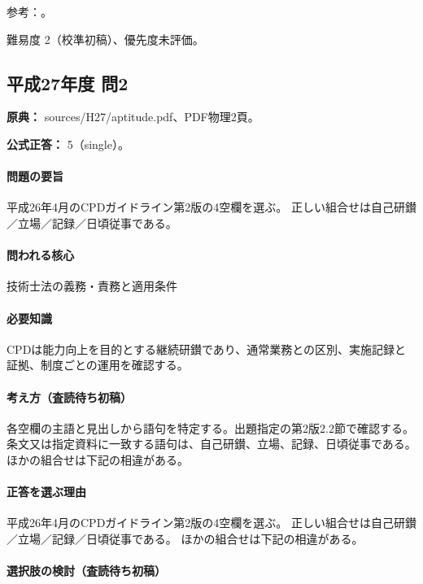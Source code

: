 \par 参考：\cite{cpd_v1}。

\par 難易度 2（校準初稿）、優先度未評価。

\subsection{平成27年度 問2}
\label{q:h27-reg-apt-02}

\noindent\textbf{原典：} sources/H27/aptitude.pdf、PDF物理2頁。

\textbf{公式正答：} 5（single）。

\paragraph{問題の要旨} 平成26年4月のCPDガイドライン第2版の4空欄を選ぶ。 正しい組合せは自己研鑚／立場／記録／日頃従事である。

\paragraph{問われる核心} 技術士法の義務・責務と適用条件

\paragraph{必要知識} CPDは能力向上を目的とする継続研鑚であり、通常業務との区別、実施記録と証拠、制度ごとの運用を確認する。

\paragraph{考え方（査読待ち初稿）} 各空欄の主語と見出しから語句を特定する。出題指定の第2版2.2節で確認する。 条文又は指定資料に一致する語句は、自己研鑚、立場、記録、日頃従事である。ほかの組合せは下記の相違がある。

\paragraph{正答を選ぶ理由} 平成26年4月のCPDガイドライン第2版の4空欄を選ぶ。 正しい組合せは自己研鑚／立場／記録／日頃従事である。 ほかの組合せは下記の相違がある。

\paragraph{選択肢の検討（査読待ち初稿）}\mbox{}\par

